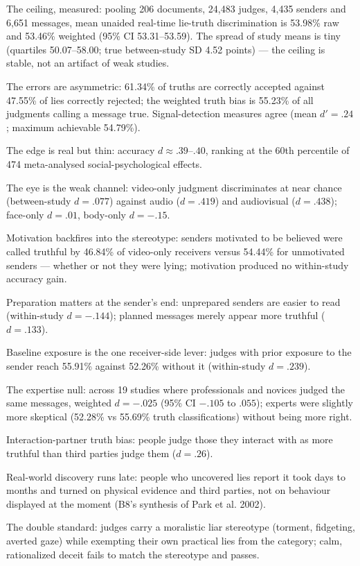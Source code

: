 \begin{distilled}
  \item The ceiling, measured: pooling 206 documents, 24,483 judges, 4,435 senders and 6,651 messages, mean unaided real-time lie-truth discrimination is 53.98\% raw and 53.46\% weighted (95\% CI 53.31--53.59). The spread of study means is tiny (quartiles 50.07--58.00; true between-study SD 4.52 points) --- the ceiling is stable, not an artifact of weak studies.
  \item The errors are asymmetric: 61.34\% of truths are correctly accepted against 47.55\% of lies correctly rejected; the weighted truth bias is 55.23\% of all judgments calling a message true. Signal-detection measures agree (mean $d' = .24$; maximum achievable 54.79\%).
  \item The edge is real but thin: accuracy $d \approx .39$--$.40$, ranking at the 60th percentile of 474 meta-analysed social-psychological effects.
  \item The eye is the weak channel: video-only judgment discriminates at near chance (between-study $d = .077$) against audio ($d = .419$) and audiovisual ($d = .438$); face-only $d = .01$, body-only $d = -.15$.
  \item Motivation backfires into the stereotype: senders motivated to be believed were called truthful by 46.84\% of video-only receivers versus 54.44\% for unmotivated senders --- whether or not they were lying; motivation produced no within-study accuracy gain.
  \item Preparation matters at the sender's end: unprepared senders are easier to read (within-study $d = -.144$); planned messages merely appear more truthful ($d = .133$).
  \item Baseline exposure is the one receiver-side lever: judges with prior exposure to the sender reach 55.91\% against 52.26\% without it (within-study $d = .239$).
  \item The expertise null: across 19 studies where professionals and novices judged the same messages, weighted $d = -.025$ (95\% CI $-.105$ to $.055$); experts were slightly more skeptical (52.28\% vs 55.69\% truth classifications) without being more right.
  \item Interaction-partner truth bias: people judge those they interact with as more truthful than third parties judge them ($d = .26$).
  \item Real-world discovery runs late: people who uncovered lies report it took days to months and turned on physical evidence and third parties, not on behaviour displayed at the moment (B8's synthesis of Park et al. 2002).
  \item The double standard: judges carry a moralistic liar stereotype (torment, fidgeting, averted gaze) while exempting their own practical lies from the category; calm, rationalized deceit fails to match the stereotype and passes.
\end{distilled}

